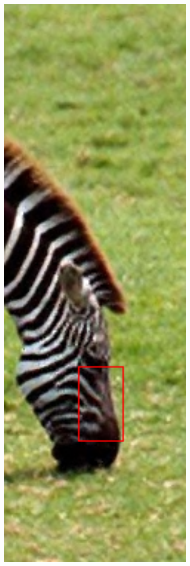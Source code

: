 \documentclass[review,numbers,sort&compress]{elsarticle}  %
\begin{document}
\begin{figure}[t]
{\begin{minipage}[b]{0.12\textwidth}
                \includegraphics[width=1\textwidth]{compareImage/zebra_crop_OUR.png} \\

\end{minipage}}
\end{figure}
\end{document}
